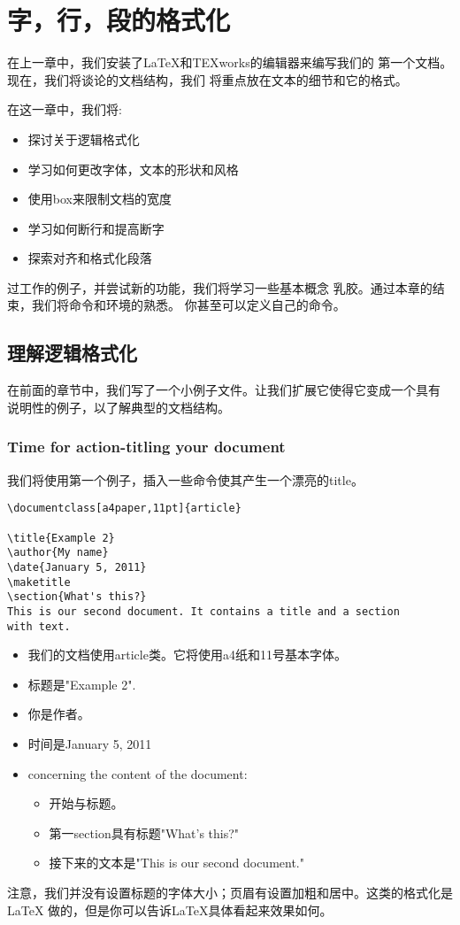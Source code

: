 \chapter{字，行，段的格式化}
在上一章中，我们安装了LaTeX和TEXworks的编辑器来编写我们的
第一个文档。现在，我们将谈论的文档结构，我们
将重点放在文本的细节和它的格式。

在这一章中，我们将:
\begin{itemize}
	\item 探讨关于逻辑格式化
	\item 学习如何更改字体，文本的形状和风格
	\item 使用box来限制文档的宽度
	\item 学习如何断行和提高断字
	\item 探索对齐和格式化段落
\end{itemize}

过工作的例子，并尝试新的功能，我们将学习一些基本概念
乳胶。通过本章的结束，我们将命令和环境的熟悉。
你甚至可以定义自己的命令。
	\section{理解逻辑格式化}
在前面的章节中，我们写了一个小例子文件。让我们扩展它使得它变成一个具有
说明性的例子，以了解典型的文档结构。
		\subsection{Time for action-titling your document}
我们将使用第一个例子，插入一些命令使其产生一个漂亮的title。
\begin{lstlisting}[language={[LaTeX]TeX}]
\documentclass[a4paper,11pt]{article}

\title{Example 2}
\author{My name}
\date{January 5, 2011}
\maketitle
\section{What's this?}
This is our second document. It contains a title and a section
with text.

\end{lstlisting}
\begin{itemize}
	\item 我们的文档使用article类。它将使用a4纸和11号基本字体。
	\item 标题是"Example 2".
	\item 你是作者。
	\item 时间是January 5, 2011
	\item concerning the content of the document:
		\begin{itemize}
			\item 开始与标题。
			\item 第一section具有标题"What's this?"
			\item 接下来的文本是"This is our second document."
		\end{itemize}
\end{itemize}
注意，我们并没有设置标题的字体大小；页眉有设置加粗和居中。这类的格式化是LaTeX
做的，但是你可以告诉LaTeX具体看起来效果如何。
